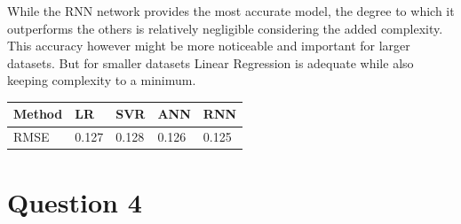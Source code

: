 \documentclass[a4paper, article, oneside, USenglish, IN5460]{memoir}
\begin{document}
While the RNN network provides the most accurate model, the degree to which it outperforms the others is relatively negligible considering the added complexity. This accuracy however might be more noticeable and important for larger datasets. But for smaller datasets Linear Regression is adequate while also keeping complexity to a minimum. 

\begin{table}[H]\centering
\begin{tabular}{|l|l|l|l|l|}
\hline
Method & LR     & SVR     & ANN    & RNN \\ \hline
RMSE   & 0.127  & 0.128   & 0.126      & 0.125   \\ \hline
\end{tabular}
\end{table}


\chapter*{Question 4}
\end{document}
